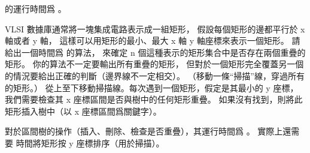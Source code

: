  的運行時間爲 。
\stopANSWER

\startEXERCISE\DIFFICULT
VLSI 數據庫通常將一塊集成電路表示成一組矩形，
假設每個矩形的邊都平行於 x 軸或者 y 軸，
這樣可以用矩形的最小、最大 x 軸 y 軸座標來表示一個矩形。
請給出一個時間爲  的算法，
來確定 n 個這種表示的矩形集合中是否存在兩個重疊的矩形。
你的算法不一定要輸出所有重疊的矩形，
但對於一個矩形完全覆蓋另一個的情況要給出正確的判斷（邊界線不一定相交）。
（\hint 移動一條“掃描”線，穿過所有的矩形。）
\stopEXERCISE
\startANSWER
從上至下移動掃描線。每次遇到一個矩形，假定是其最小的 y 座標，
我們需要檢查其 x 座標區間是否與樹中的任何矩形重疊。
如果沒有找到，則將此矩形插入樹中（以 x 座標區間爲關鍵字）。

對於區間樹的操作（插入、刪除、檢查是否重疊），其運行時間爲 。
實際上還需要  時間將矩形按 y 座標排序（用於掃描）。
\stopANSWER

\stopsection
